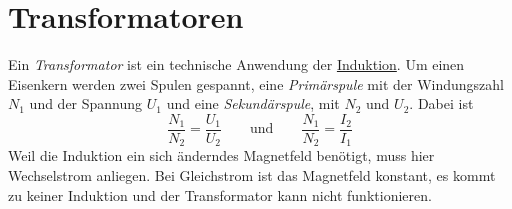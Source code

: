 \documentclass{article}
\begin{document}
\section{Transformatoren} 
Ein \emph{Transformator} ist ein technische Anwendung der \hyperref[Induktion]{Induktion}. Um einen Eisenkern werden zwei Spulen gespannt, eine \emph{Primärspule} mit der Windungszahl $N_1$ und der Spannung $U_1$ und eine \emph{Sekundärspule}, mit $N_2$ und $U_2$. Dabei ist
\[
 \frac{N_1}{N_2} = \frac{U_1}{U_2} 
 \qquad \text{und} \qquad
 \frac{N_1}{N_2} = \frac{I_2}{I_1} 
\]
Weil die Induktion ein sich änderndes Magnetfeld benötigt, muss hier Wechselstrom anliegen. Bei Gleichstrom ist das Magnetfeld konstant, es kommt zu keiner Induktion und der Transformator kann nicht funktionieren. 
\end{document}
